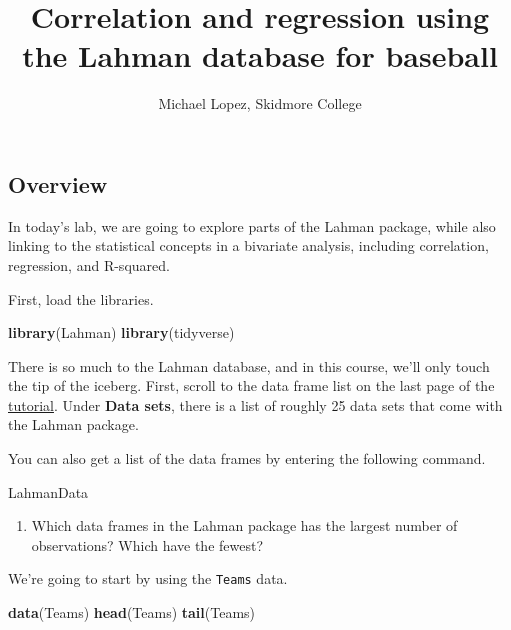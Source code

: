 \documentclass[]{article}
\title{Correlation and regression using the Lahman database for baseball}
\author{Michael Lopez, Skidmore College}
\date{}
\newenvironment{Shaded}{\begin{snugshade}}{\end{snugshade}}
\newcommand{\KeywordTok}[1]{\textcolor[rgb]{0.13,0.29,0.53}{\textbf{#1}}}
\newcommand{\NormalTok}[1]{#1}
\providecommand{\tightlist}{%
  \setlength{\itemsep}{0pt}\setlength{\parskip}{0pt}}
\begin{document}
\maketitle

\hypertarget{overview}{%
\subsection{Overview}\label{overview}}

In today's lab, we are going to explore parts of the Lahman package,
while also linking to the statistical concepts in a bivariate analysis,
including correlation, regression, and R-squared.

First, load the libraries.

\begin{Shaded}
\begin{Highlighting}[]
\KeywordTok{library}\NormalTok{(Lahman)}
\KeywordTok{library}\NormalTok{(tidyverse)}
\end{Highlighting}
\end{Shaded}

There is so much to the Lahman database, and in this course, we'll only
touch the tip of the iceberg. First, scroll to the data frame list on
the last page of the
\href{https://cran.r-project.org/web/packages/Lahman/Lahman.pdf}{tutorial}.
Under \textbf{Data sets}, there is a list of roughly 25 data sets that
come with the Lahman package.

You can also get a list of the data frames by entering the following
command.

\begin{Shaded}
\begin{Highlighting}[]
\NormalTok{LahmanData}
\end{Highlighting}
\end{Shaded}

\begin{enumerate}
\def\labelenumi{\arabic{enumi}.}
\tightlist
\item
  Which data frames in the Lahman package has the largest number of
  observations? Which have the fewest?
\end{enumerate}

We're going to start by using the \texttt{Teams} data.

\begin{Shaded}
\begin{Highlighting}[]
\KeywordTok{data}\NormalTok{(Teams)}
\KeywordTok{head}\NormalTok{(Teams)}
\KeywordTok{tail}\NormalTok{(Teams)}
\end{Highlighting}
\end{Shaded}
\end{document}
